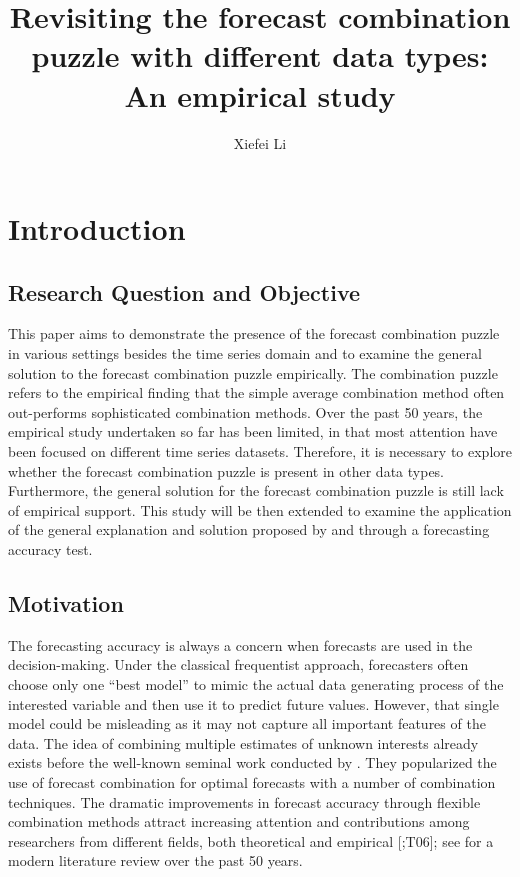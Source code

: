 \documentclass{monashthesis}
\author{Xiefei Li}
\title{Revisiting the forecast combination puzzle with different data types: An empirical study}
\begin{document}

\titlepage

{\sf\tighttoc\doublespacing}

\clearpage{}\setcounter{page}{1}

\hypertarget{ch:intro}{%
\chapter{Introduction}\label{ch:intro}}

\hypertarget{research-question-and-objective}{%
\section{Research Question and Objective}\label{research-question-and-objective}}

This paper aims to demonstrate the presence of the forecast combination puzzle in various settings besides the time series domain and to examine the general solution to the forecast combination puzzle empirically. The combination puzzle refers to the empirical finding that the simple average combination method often out-performs sophisticated combination methods. Over the past 50 years, the empirical study undertaken so far has been limited, in that most attention have been focused on different time series datasets. Therefore, it is necessary to explore whether the forecast combination puzzle is present in other data types. Furthermore, the general solution for the forecast combination puzzle is still lack of empirical support. This study will be then extended to examine the application of the general explanation and solution proposed by \textcite{ZMFP22} and \textcite{FZMP23} through a forecasting accuracy test.

\hypertarget{motivation}{%
\section{Motivation}\label{motivation}}

The forecasting accuracy is always a concern when forecasts are used in the decision-making. Under the classical frequentist approach, forecasters often choose only one ``best model'' to mimic the actual data generating process of the interested variable and then use it to predict future values. However, that single model could be misleading as it may not capture all important features of the data. The idea of combining multiple estimates of unknown interests already exists before the well-known seminal work conducted by \textcite{BG69}. They popularized the use of forecast combination for optimal forecasts with a number of combination techniques. The dramatic improvements in forecast accuracy through flexible combination methods attract increasing attention and contributions among researchers from different fields, both theoretical and empirical {[}\textcite{C89};T06{]}; see \textcite{WHLK22} for a modern literature review over the past 50 years.
\end{document}
